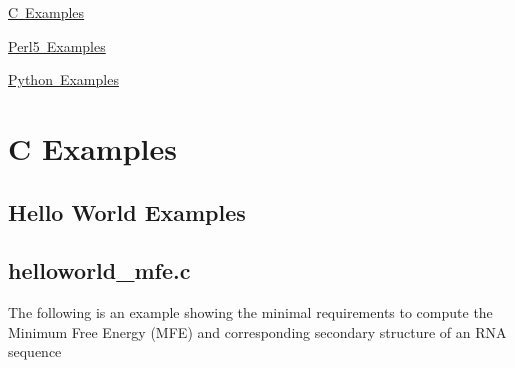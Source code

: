 
\begin{DoxyItemize}
\item \mbox{\hyperlink{examples_c}{C Examples}}
\item \mbox{\hyperlink{examples_perl5}{Perl5 Examples}}
\item \mbox{\hyperlink{examples_python}{Python Examples}} 
\end{DoxyItemize}\hypertarget{examples_c}{}\section{C Examples}\label{examples_c}
\hypertarget{examples_c_ex_c_simple}{}\subsection{Hello World Examples}\label{examples_c_ex_c_simple}
\subsection*{helloworld\+\_\+mfe.\+c }

The following is an example showing the minimal requirements to compute the Minimum Free Energy (M\+FE) and corresponding secondary structure of an R\+NA sequence


